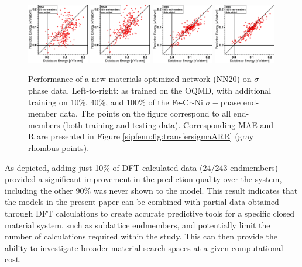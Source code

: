 \begin{figure}[H]
    \centering
    \includegraphics[width=0.24\textwidth]{sipfenn/NN20_SigmaTransfer_0.png}
    \includegraphics[width=0.24\textwidth]{sipfenn/NN20_SigmaTransfer_1.png}
    \includegraphics[width=0.24\textwidth]{sipfenn/NN20_SigmaTransfer_3.png}
    \includegraphics[width=0.24\textwidth]{sipfenn/NN20_SigmaTransfer_5.png}
    \caption{Performance of a new-materials-optimized network (NN20) on $\sigma$-phase data. Left-to-right: as trained on the OQMD, with additional training on 10\%, 40\%, and 100\% of the Fe-Cr-Ni $\sigma-$phase end-member data. The points on the figure correspond to all end-members (both training and testing data). Corresponding MAE and R are presented in Figure \ref{sipfenn:fig:transfersigmaARR} (gray rhombus points).}
    \vspace{-12pt}
    \label{sipfenn:fig:transfersigma}
\end{figure}


As depicted, adding just 10\% of DFT-calculated data (24/243 endmembers) provided a significant improvement in the prediction quality over the system, including the other 90\%  was never shown to the model. This result indicates that the models in the present paper can be combined with partial data obtained through DFT calculations to create accurate predictive tools for a specific closed material system, such as sublattice endmembers, and potentially limit the number of calculations required within the study. This can then provide the ability to investigate broader material search spaces at a given computational cost.

